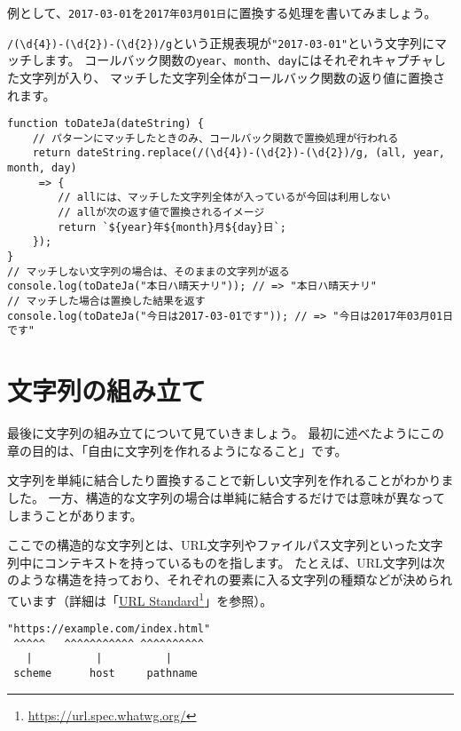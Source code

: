 例として、\texttt{2017-03-01}を\texttt{2017年03月01日}に置換する処理を書いてみましょう。

\texttt{/(\textbackslash d\{4\})-(\textbackslash d\{2\})-(\textbackslash d\{2\})/g}という正規表現が\texttt{"2017-03-01"}という文字列にマッチします。
コールバック関数の\texttt{year}、\texttt{month}、\texttt{day}にはそれぞれキャプチャした文字列が入り、
マッチした文字列全体がコールバック関数の返り値に置換されます。

\begin{lstlisting}
function toDateJa(dateString) {
    // パターンにマッチしたときのみ、コールバック関数で置換処理が行われる
    return dateString.replace(/(\d{4})-(\d{2})-(\d{2})/g, (all, year, month, day)
     => {
        // allには、マッチした文字列全体が入っているが今回は利用しない
        // allが次の返す値で置換されるイメージ
        return `${year}年${month}月${day}日`;
    });
}
// マッチしない文字列の場合は、そのままの文字列が返る
console.log(toDateJa("本日ハ晴天ナリ")); // => "本日ハ晴天ナリ"
// マッチした場合は置換した結果を返す
console.log(toDateJa("今日は2017-03-01です")); // => "今日は2017年03月01日です"
\end{lstlisting}

\hypertarget{built}{%
\section{文字列の組み立て}\label{built}}

最後に文字列の組み立てについて見ていきましょう。
最初に述べたようにこの章の目的は、「自由に文字列を作れるようになること」です。

文字列を単純に結合したり置換することで新しい文字列を作れることがわかりました。
一方、構造的な文字列の場合は単純に結合するだけでは意味が異なってしまうことがあります。

ここでの構造的な文字列とは、URL文字列やファイルパス文字列といった文字列中にコンテキストを持っているものを指します。
たとえば、URL文字列は次のような構造を持っており、それぞれの要素に入る文字列の種類などが決められています（詳細は「\href{https://url.spec.whatwg.org/}{URL
Standard}\footnote{\url{https://url.spec.whatwg.org/}}」を参照）。

\begin{lstlisting}
"https://example.com/index.html"
 ^^^^^   ^^^^^^^^^^^ ^^^^^^^^^^
   |          |     　　　|
 scheme      host     pathname
\end{lstlisting}

